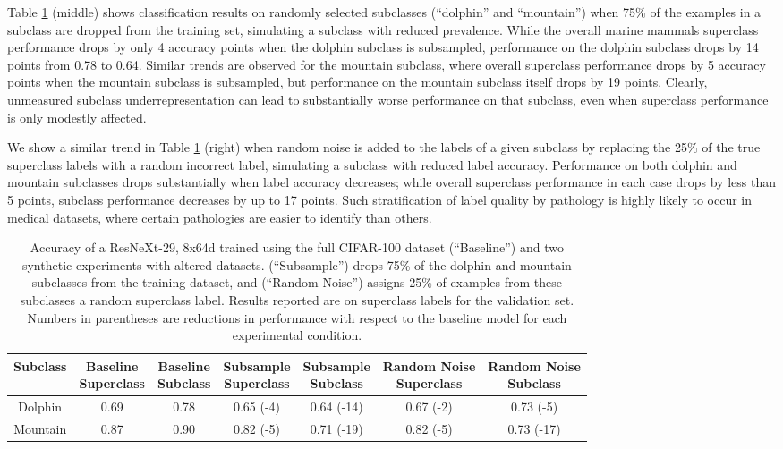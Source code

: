 \documentclass[sigconf,anonymous,review]{acmart}
\begin{document}
 Table \ref{tab:cifar1} (middle) shows classification results on randomly selected subclasses (``dolphin'' and ``mountain'') when 75\% of the examples in a subclass are dropped from the training set, simulating a subclass with reduced prevalence.  
 While the overall marine mammals superclass performance drops by only 4 accuracy points when the dolphin subclass is subsampled, performance on the dolphin subclass drops by 14 points from 0.78 to 0.64.  
 Similar trends are observed for the mountain subclass, where overall superclass performance drops by 5 accuracy points when the mountain subclass is subsampled, but performance on the mountain subclass itself drops by 19 points.  
 Clearly, unmeasured subclass underrepresentation can lead to substantially worse performance on that subclass, even when superclass performance is only modestly affected.
 
We show a similar trend in Table \ref{tab:cifar1} (right) when random noise is added to the labels of a given subclass by replacing the 25\% of the true superclass labels with a random incorrect label, simulating a subclass with reduced label accuracy.
Performance on both dolphin and mountain subclasses drops substantially when label accuracy decreases; while overall superclass performance in each case drops by less than 5 points, subclass performance decreases by up to 17 points.  
Such stratification of label quality by pathology is highly likely to occur in medical datasets, where certain pathologies are easier to identify than others.

\begin{table}[]
\centering
\begin{tabular}{ccccccc}
\toprule
 Subclass & \makecell{Baseline \\ Superclass} & \makecell{Baseline \\ Subclass}   &  \makecell{Subsample \\ Superclass}    & \makecell{Subsample \\ Subclass}  &  \makecell{Random Noise \\ Superclass}    & \makecell{Random Noise \\ Subclass} \\
 \toprule
 Dolphin & 0.69 & 0.78  & 0.65 (-4)  & 0.64 (-14) & 0.67 (-2) & 0.73 (-5)   \\
 Mountain & 0.87 & 0.90  & 0.82 (-5) & 0.71 (-19) & 0.82 (-5) & 0.73 (-17)  \\
 \toprule
\end{tabular}
\caption{Accuracy of a ResNeXt-29, 8x64d trained using the full CIFAR-100 dataset (``Baseline'') and two synthetic experiments with altered datasets. (``Subsample'') drops 75\% of the dolphin and mountain subclasses from the training dataset, and (``Random Noise'') assigns 25\% of examples from these subclasses a random superclass label.  Results reported are on  superclass labels for the validation set.  Numbers in parentheses are reductions in performance with respect to the baseline model for each experimental condition.}
\label{tab:cifar1}
\end{table}
\end{document}
